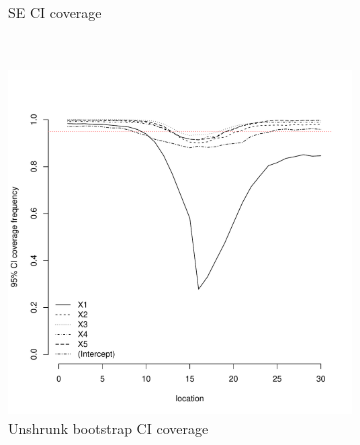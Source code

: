\documentclass[authoryear, review, 11pt]{elsarticle}
\begin{document}
\begin{figure}
\begin{subfigure}[b]{0.45\textwidth}
		\caption{SE CI coverage}
	\end{subfigure}%
	\\%
	\begin{subfigure}[b]{0.45\textwidth}
	\centering
		\includegraphics[width=\textwidth]{../../figures/simulation/15.19.profile_unshrunk_bootstrap_coverage.pdf}
		\caption{Unshrunk bootstrap CI coverage}
	\end{subfigure}%
	~ %
	\begin{subfigure}[b]{0.45\textwidth}
	\centering

\end{subfigure}
\end{figure}
\end{document}
